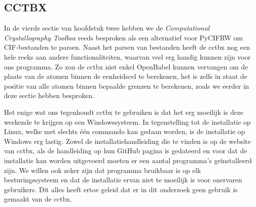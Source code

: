 \subsection{CCTBX}
In de vierde sectie van hoofdstuk twee hebben we de \textit{Computational Crystallography Toolbox} reeds besproken als een alternatief voor PyCIFRW om CIF-bestanden te parsen. Naast het parsen van bestanden heeft de cctbx nog een hele reeks aan andere functionaliteiten, waarvan veel erg handig kunnen zijn voor ons programma. Zo zou de cctbx niet enkel OpenBabel kunnen vervangen om de plaats van de atomen binnen de eenheidscel te berekenen, het is zelfs in staat de positie van alle atomen binnen bepaalde grenzen te berekenen, zoals we eerder in deze sectie hebben besproken.
\par
Het enige wat ons tegenhoudt cctbx te gebruiken is dat het erg moeilijk is deze werkende te krijgen op een Windowssysteem. In tegenstelling tot de installatie op Linux, welke met slechts één commando kan gedaan worden, is de installatie op Windows erg lastig. Zowel de installatiehandleiding die te vinden is op de website van cctbx, als de handleiding op hun GitHub pagina is gedateerd en voor dat de installatie kan worden uitgevoerd moeten er een aantal programma's geïnstalleerd zijn. We willen ook zeker zijn dat programma bruikbaar is op elk besturingssysteem en dat de installatie ervan niet te moeilijk is voor onervaren gebruikers. Dit alles heeft ertoe geleid dat er in dit onderzoek geen gebruik is gemaakt van de cctbx.

